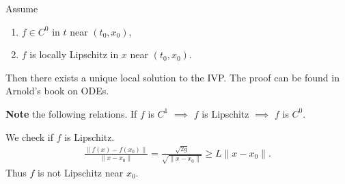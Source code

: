 \begin{theorem}[Picard]
	Assume 
	\begin{enumerate}
		\item  $f \in C^0$ in $t$ near $(t_0,  {x}_0)$,
		\item $f$ is locally Lipschitz in $ {x}$ near $(t_0,  {x}_0)$.
	\end{enumerate}
	Then there exists a unique local solution to the IVP. The proof can be found in Arnold's book on ODEs. 	
\end{theorem}
\textbf{Note} the following relations. If $f$ is $C^1$ $\implies$ $f $ is Lipschitz $\implies $ $f$ is $C^0$.
\begin{ex}
	We check if $f$ is Lipschitz.
	\begin{align}
		\frac{ \| f(x) - f(x_0)  \|}{ \|x-x_0 \|} = \frac{\sqrt{2g}}{\sqrt{ \|x-x_0 \|}} \geq  L  \| x - x_0 \|.
	\end{align}
Thus $f$ is not Lipschitz near $x_0$.	
\end{ex}


